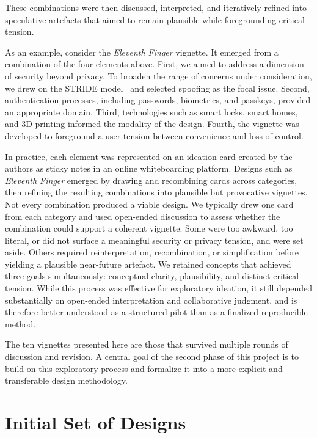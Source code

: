 These combinations were then discussed, interpreted, and iteratively refined into speculative artefacts that aimed to remain plausible while foregrounding critical tension. %

As an example, consider the \textit{Eleventh Finger} vignette. It emerged from a combination of the four elements above. First, we aimed to address a dimension of security beyond privacy. To broaden the range of concerns under consideration, we drew on the STRIDE model~\cite{shostack2014threat} and selected spoofing as the focal issue. Second, authentication processes, including passwords, biometrics, and passkeys, provided an appropriate domain. Third, technologies such as smart locks, smart homes, and 3D printing informed the modality of the design. Fourth, the vignette was developed to foreground a user tension between convenience and loss of control.

In practice, each element was represented on an ideation card created by the authors as sticky notes in an online whiteboarding platform. Designs such as \textit{Eleventh Finger} emerged by drawing and recombining cards across categories, then refining the resulting combinations into plausible but provocative vignettes. Not every combination produced a viable design. We typically drew one card from each category and used open-ended discussion to assess whether the combination could support a coherent vignette. Some were too awkward, too literal, or did not surface a meaningful security or privacy tension, and were set aside. Others required reinterpretation, recombination, or simplification before yielding a plausible near-future artefact. We retained concepts that achieved three goals simultaneously: conceptual clarity, plausibility, and distinct critical tension. While this process was effective for exploratory ideation, it still depended substantially on open-ended interpretation and collaborative judgment, and is therefore better understood as a structured pilot than as a finalized reproducible method.

The ten vignettes presented here are those that survived multiple rounds of discussion and revision. A central goal of the second phase of this project is to build on this exploratory process and formalize it into a more explicit and transferable design methodology.



\section{Initial Set of Designs}
\label{sec:meth1}

